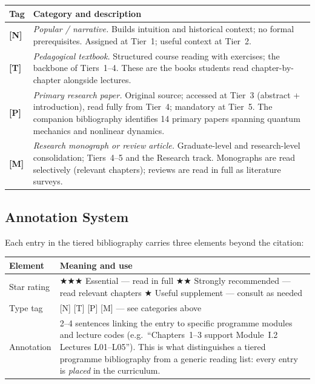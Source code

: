 \documentclass[11pt,a4paper]{article}
\begin{document}
\begin{center}
\begin{tabular}{lp{10cm}}
\toprule
\textbf{Tag} & \textbf{Category and description}\\
\midrule
\textbf{[N]} & \textit{Popular / narrative.} Builds intuition and historical context;
               no formal prerequisites. Assigned at Tier~1; useful context at Tier~2.\\[4pt]
\textbf{[T]} & \textit{Pedagogical textbook.} Structured course reading with exercises;
               the backbone of Tiers~1--4. These are the books students read
               chapter-by-chapter alongside lectures.\\[4pt]
\textbf{[P]} & \textit{Primary research paper.} Original source; accessed at Tier~3
               (abstract + introduction), read fully from Tier~4; mandatory at Tier~5.
               The companion bibliography identifies 14 primary papers spanning
               quantum mechanics and nonlinear dynamics.\\[4pt]
\textbf{[M]} & \textit{Research monograph or review article.} Graduate-level and
               research-level consolidation; Tiers~4--5 and the Research track.
               Monographs are read selectively (relevant chapters); reviews are
               read in full as literature surveys.\\
\bottomrule
\end{tabular}
\end{center}

\subsection{Annotation System}

Each entry in the tiered bibliography carries three elements beyond the citation:

\medskip
\begin{center}
\begin{tabular}{lp{10.5cm}}
\toprule
\textbf{Element} & \textbf{Meaning and use}\\
\midrule
Star rating & \textbf{\large$\bigstar\bigstar\bigstar$} Essential --- read in full
             \quad\textbf{\large$\bigstar\bigstar$} Strongly recommended --- read
             relevant chapters
             \quad\textbf{\large$\bigstar$} Useful supplement --- consult as needed\\[6pt]
Type tag    & [N] [T] [P] [M] --- see categories above\\[6pt]
Annotation  & 2--4 sentences linking the entry to specific programme modules and
             lecture codes (e.g.\ ``Chapters~1--3 support Module~I.2 Lectures L01--L05'').
             This is what distinguishes a tiered programme bibliography from a generic
             reading list: every entry is \emph{placed} in the curriculum.\\
\bottomrule
\end{tabular}
\end{center}
\end{document}

